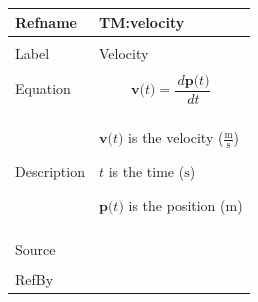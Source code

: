 \documentclass[12pt]{article}
\begin{document}
\begin{minipage}{\textwidth}
\begin{tabular}{>{\raggedright}p{}>{\raggedright\arraybackslash}p{}}
\toprule \textbf{Refname} & \textbf{TM:velocity}
\label{TM:velocity}
\\ \midrule \\
Label & Velocity
        
\\ \midrule \\
Equation & \begin{displaymath}
           \symbf{v}\text{(}t\text{)}=\frac{\,d\symbf{p}\text{(}t\text{)}}{\,dt}
           \end{displaymath}
\\ \midrule \\
Description & \begin{symbDescription}
              \item{$\symbf{v}\text{(}t\text{)}$ is the velocity ($\frac{\text{m}}{\text{s}}$)}
              \item{$t$ is the time (${\text{s}}$)}
              \item{$\symbf{p}\text{(}t\text{)}$ is the position (${\text{m}}$)}
              \end{symbDescription}
\\ \midrule \\
Source & \cite{velocityWiki}
         
\\ \midrule \\
RefBy & 
\\ \bottomrule
\end{tabular}
\end{minipage}
\vspace{\baselineskip}
\noindent
\end{document}

